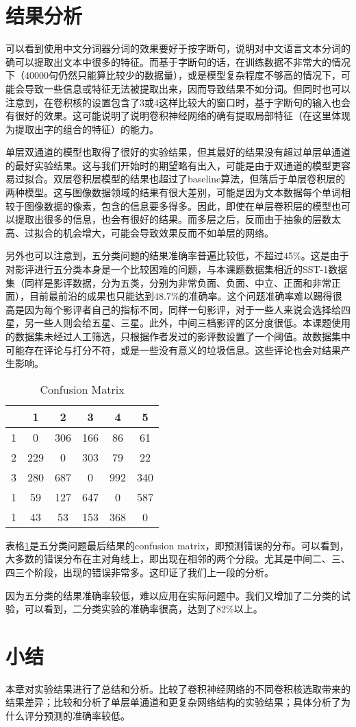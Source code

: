 \section{结果分析}
可以看到使用中文分词器分词的效果要好于按字断句，说明对中文语言文本分词的确可以提取出文本中很多的特征。而基于字断句的话，在训练数据不非常大的情况下（40000句仍然只能算比较少的数据量），或是模型复杂程度不够高的情况下，可能会导致一些信息或特征无法被提取出来，因而导致结果不如分词。但同时也可以注意到，在卷积核的设置包含了3或4这样比较大的窗口时，基于字断句的输入也会有很好的效果。这可能说明了说明卷积神经网络的确有提取局部特征（在这里体现为提取出字的组合的特征）的能力。

单层双通道的模型也取得了很好的实验结果，但其最好的结果没有超过单层单通道的最好实验结果。这与我们开始时的期望略有出入，可能是由于双通道的模型更容易过拟合。双层卷积层模型的结果也超过了baseline算法，但落后于单层卷积层的两种模型。这与图像数据领域的结果有很大差别，可能是因为文本数据每个单词相较于图像数据的像素，包含的信息要多得多。因此，即使在单层卷积层的模型也可以提取出很多的信息，也会有很好的结果。而多层之后，反而由于抽象的层数太高、过拟合的机会增大，可能会导致效果反而不如单层的网络。

另外也可以注意到，五分类问题的结果准确率普遍比较低，不超过45\%。这是由于对影评进行五分类本身是一个比较困难的问题，与本课题数据集相近的SST-1数据集（同样是影评数据，分为五类，分别为非常负面、负面、中立、正面和非常正面），目前最前沿的成果也只能达到48.7\%的准确率。这个问题准确率难以踢得很高是因为每个影评者自己的指标不同，同样一句影评，对于一些人来说会选择给四星，另一些人则会给五星、三星。此外，中间三档影评的区分度很低。本课题使用的数据集未经过人工筛选，只根据作者发过的影评数设置了一个阈值。故数据集中可能存在评论与打分不符，或是一些没有意义的垃圾信息。这些评论也会对结果产生影响。

\begin{table}
\centering
\caption{Confusion Matrix} \label{tab:confusion}
\begin{tabular}{c|c|c|c|c|c}
    \hline
     & 1 & 2 & 3 & 4 & 5\\
    \hline
    1 & 0 & 306 & 166 & 86 & 61\\
    \hline
    2 & 229 & 0 & 303 & 79 & 22 \\
    \hline
    3 & 280 & 687 & 0 & 992 & 340 \\
    \hline
    1 & 59 & 127 & 647 & 0 & 587\\
    \hline
    1 & 43 & 53 & 153 & 368 & 0\\
    \hline
\end{tabular}
\end{table}

表格\ref{tab:confusion}是五分类问题最后结果的confusion matrix，即预测错误的分布。可以看到，大多数的错误分布在主对角线上，即出现在相邻的两个分段。尤其是中间二、三、四三个阶段，出现的错误非常多。这印证了我们上一段的分析。

因为五分类的结果准确率较低，难以应用在实际问题中。我们又增加了二分类的试验，可以看到，二分类实验的准确率很高，达到了82\%以上。

\section{小结}
本章对实验结果进行了总结和分析。比较了卷积神经网络的不同卷积核选取带来的结果差异；比较和分析了单层单通道和更复杂网络结构的实验结果；具体分析了为什么评分预测的准确率较低。

